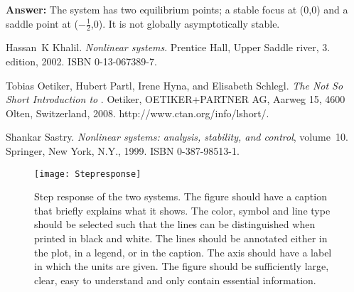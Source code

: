 \documentclass[a4paper]{article} %
\begin{document}
\noindent \textbf{Answer:} The system has two equilibrium points; a stable focus at \mbox{(0,0)} and a saddle point at \mbox{($-\frac{1}{2}$,0)}. It is not globally asymptotically stable.




\begin{thebibliography}{99}
Hassan~K Khalil.
\newblock \emph{Nonlinear systems}.
\newblock Prentice Hall, Upper Saddle river, 3. edition, 2002.
\newblock ISBN 0-13-067389-7.

Tobias Oetiker, Hubert Partl, Irene Hyna, and Elisabeth Schlegl.
\newblock \emph{The Not So Short Introduction to \LaTeXe}.
\newblock Oetiker, OETIKER+PARTNER AG, Aarweg 15, 4600 Olten, Switzerland,
  2008.
\newblock http://www.ctan.org/info/lshort/.

Shankar Sastry.
\newblock \emph{Nonlinear systems: analysis, stability, and control},
  volume~10.
\newblock Springer, New York, N.Y., 1999.
\newblock ISBN 0-387-98513-1.
\end{thebibliography}



\clearpage %

\begin{figure*}[p] %
  \begin{center}
    \texttt{[image: Stepresponse]}
  \end{center}
  \caption{Step response of the two systems. The figure should have a caption that briefly explains what it shows. The color, symbol and line type should be selected such that the lines can be distinguished when printed in black and white. The lines should be annotated either in the plot, in a legend, or in the caption. The axis should have a label in which the units are given. The figure should be sufficiently large, clear, easy to understand and only contain essential information.}
  \label{fig:prestanda}
\end{figure*}
\end{document}
